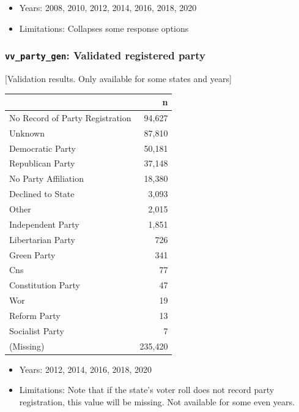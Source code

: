 \documentclass[10pt,article,oneside]{memoir}
\theoremstyle{definition}
\begin{document}
\begin{itemize}
\tightlist
\item
  Years: 2008, 2010, 2012, 2014, 2016, 2018, 2020
\item
  Limitations: Collapses some response options
\end{itemize}

\hypertarget{vv_party_gen-validated-registered-party}{%
\subsubsection{\texorpdfstring{\texttt{vv\_party\_gen}: Validated
registered
party}{vv\_party\_gen: Validated registered party}}\label{vv_party_gen-validated-registered-party}}

{[}Validation results. Only available for some states and years{]}

\begin{table}[H]
\centering
\begin{tabular}{lr}
\toprule
 & n\\
\midrule
No Record of Party Registration & 94,627\\
Unknown & 87,810\\
Democratic Party & 50,181\\
Republican Party & 37,148\\
No Party Affiliation & 18,380\\
Declined to State & 3,093\\
Other & 2,015\\
Independent Party & 1,851\\
Libertarian Party & 726\\
Green Party & 341\\
Cns & 77\\
Constitution Party & 47\\
Wor & 19\\
Reform Party & 13\\
Socialist Party & 7\\
(Missing) & 235,420\\
\bottomrule
\end{tabular}
\end{table}

\begin{itemize}
\tightlist
\item
  Years: 2012, 2014, 2016, 2018, 2020
\item
  Limitations: Note that if the state's voter roll does not record party
  registration, this value will be missing. Not available for some even
  years.
\end{itemize}
\end{document}

